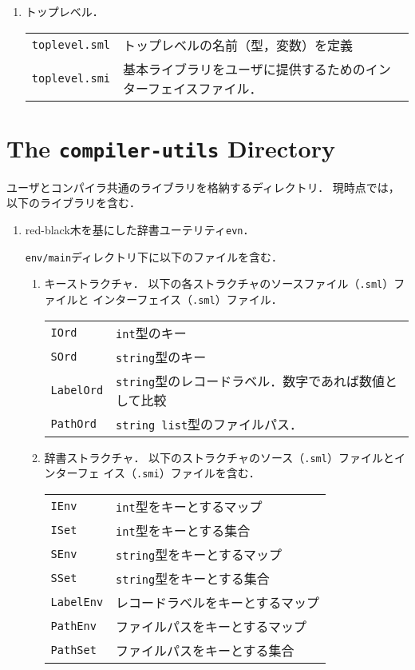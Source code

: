 \documentclass{jbook}
\newcommand{\txt}[2]{#2}
\newcommand{\code}[1]{\mbox{\large\tt #1}}
\begin{document}
\begin{enumerate}
\item トップレベル．

\begin{tabular}{ll}
\code{toplevel.sml} & トップレベルの名前（型，変数）を定義
\\
\code{toplevel.smi} & 基本ライブラリをユーザに提供するためのインターフェイスファイル．
\end{tabular}
\end{enumerate}
\else%
\fi%

\section{\txt{\code{compiler-utils}ディレクトリ}{The \code{compiler-utils} Directory}}
\ifjp%
	ユーザとコンパイラ共通のライブラリを格納するディレクトリ．
	現時点では，以下のライブラリを含む．

\begin{enumerate}
\item red-black木を基にした辞書ユーテリティ\code{evn}．

	\code{env/main}ディレクトリ下に以下のファイルを含む．
\begin{enumerate}
\item キーストラクチャ．
	以下の各ストラクチャのソースファイル（\code{.sml}）ファイルと
インターフェイス（\code{.sml}）ファイル．
\begin{tabular}{ll}
\code{IOrd} & \code{int}型のキー\\
\code{SOrd} & \code{string}型のキー\\
\code{LabelOrd} & \code{string}型のレコードラベル．数字であれば数値として比較\\
\code{PathOrd} & \code{string list}型のファイルパス．
\end{tabular}

\item 辞書ストラクチャ．
	以下のストラクチャのソース（\code{.sml}）ファイルとインターフェ
イス（\code{.smi}）ファイルを含む．
\begin{tabular}{ll}
\code{IEnv} & \code{int}型をキーとするマップ
\\
\code{ISet} & \code{int}型をキーとする集合
\\
\code{SEnv} & \code{string}型をキーとするマップ
\\
\code{SSet} & \code{string}型をキーとする集合
\\
\code{LabelEnv} & レコードラベルをキーとするマップ
\\
\code{PathEnv} & ファイルパスをキーとするマップ
\\
\code{PathSet} & ファイルパスをキーとする集合
\end{tabular}
\end{enumerate}
\end{enumerate}
\end{document}
